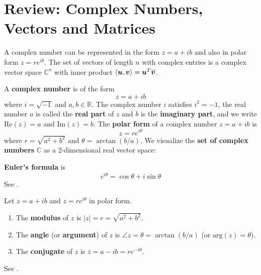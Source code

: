 \section{Review: Complex Numbers, Vectors and Matrices}

\begin{bigidea}
A complex number can be represented in the form $z = a + i b$ and also in polar form $z = r e^{i \theta}$. The set of vectors of length $n$ with complex entries is a complex vector space $\mathbb{C}^n$ with inner product $\langle \boldsymbol{u} , \boldsymbol{v} \rangle = \boldsymbol{u}^T \overline{\boldsymbol{v}}$.
\end{bigidea}

\begin{definition}
A {\bf complex number} \cite[p.597]{KN} is of the form
$$
z = a + i b
$$
where $i = \sqrt{-1}$ and $a,b \in \mathbb{R}$. The complex number $i$ satisfies $i^2 = -1$, the real number $a$ is called the {\bf real part} of $z$ and $b$ is the {\bf imaginary part}, and we write $\mathrm{Re}(z) = a$ and $\mathrm{Im}(z) = b$. The {\bf polar form} \cite[p.601]{KN} of a complex number $z = a + i b$ is
$$
z = r e^{i \theta}
$$
where $r = \sqrt{a^2 + b^2}$ and $\theta = \arctan(b/a)$. We visualize the {\bf set of complex numbers} $\mathbb{C}$ as a 2-dimensional real vector space:
\begin{center}
\end{center}
\end{definition}

\begin{theorem}
{\bf Euler's formula} is
$$
e^{i \theta} = \cos \theta + i \sin \theta
$$
See \cite[p.602]{KN}.
\end{theorem}

\begin{definition}
Let $z = a + ib$ and $z = re^{i \theta}$ in polar form.
\begin{enumerate}
\item The {\bf modulus} of $z$ is $|z| = r = \sqrt{a^2 + b^2}$.
\item The {\bf angle} (or {\bf argument}) of $z$ is $\angle z = \theta = \arctan(b/a)$ (or $\mathrm{arg}(z) = \theta$).
\item The {\bf conjugate} of $z$ is $\overline{z} = a - ib = re^{- i \theta}$.
\end{enumerate}
See \cite[p.599]{KN}.
\end{definition}

